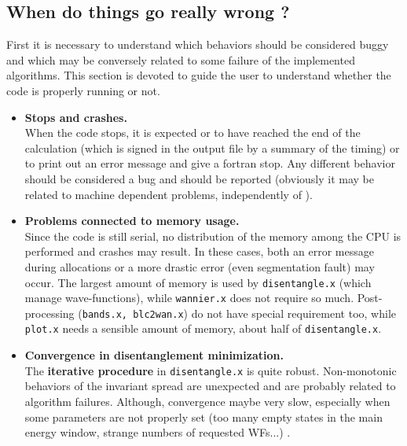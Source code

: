 \subsection{When do things go really wrong ?}
First it is necessary to understand which behaviors should be considered buggy and
which may be conversely related to some failure of the implemented algorithms.
This section is devoted to guide the user to understand whether the code is
properly running or not. \\
%
%
\begin{itemize}
\item   {\bf Stops and crashes.} \\
        When the code stops, it is expected or to have reached the end
        of the calculation (which is signed in the output file by a summary
        of the timing) or to print
        out an error message and give a fortran stop. Any different behavior
        should be considered a bug and should be reported
        (obviously it may be related to machine dependent problems,
        independently of \WANT).

\item   {\bf Problems connected to memory usage.} \\
        Since the code is still serial, no distribution of the memory among the
        CPU is performed and crashes may result. In these cases, both an
        error message during allocations or a more drastic error (even segmentation
        fault) may occur. The largest amount of memory is used by
        {\tt disentangle.x} (which manage wave-functions), while {\tt wannier.x}
        does not require so much. Post-processing ({\tt bands.x, blc2wan.x})
        do not have special requirement too, while {\tt plot.x} needs a sensible
        amount of memory, about half of {\tt disentangle.x}.

\item   {\bf Convergence in disentanglement minimization.} \\
        The {\bf iterative procedure} in {\tt disentangle.x} is quite robust.
        Non-monotonic behaviors of the invariant spread are unexpected
        and are probably related to algorithm failures. Although, convergence
        maybe very slow, especially when some parameters are not properly set
        (too many empty states in the main energy window, strange numbers of
        requested WFs...) .


\end{itemize}
